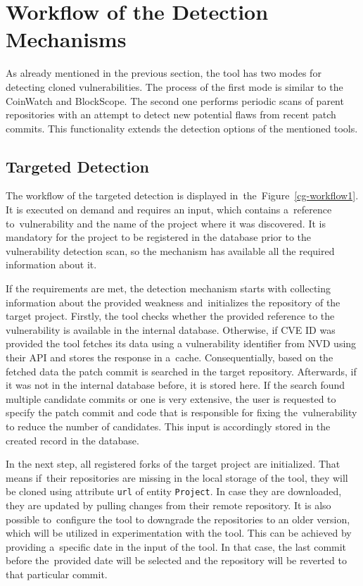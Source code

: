   \section{Workflow of the Detection Mechanisms}
  \label{section:workflow}
  As already mentioned in the previous section, the tool has two modes for detecting cloned vulnerabilities.
  The process of the first mode is similar to the CoinWatch and BlockScope. The second one
  performs periodic scans of parent repositories with an attempt to detect new potential
  flaws from recent patch commits. This functionality extends the detection options of the mentioned tools.

  \subsection*{Targeted Detection}
  \label{section:targeted-detection}
  The workflow of the targeted detection is displayed in~the~Figure~\ref{cg-workflow1}.
  It is executed on demand and requires an input, which contains a~reference to~vulnerability and the name of the project
  where it was discovered. It is mandatory for the project to be registered in the database prior to the vulnerability detection scan, so the mechanism
  has available all the required information about it.

  If the requirements are met, the detection mechanism starts with collecting information about the provided weakness
  and~initializes the repository of the target project. Firstly, the tool checks whether the provided reference
  to the vulnerability is available in the internal database. Otherwise, if CVE ID was provided the tool fetches
  its data using a vulnerability identifier from NVD using their API and stores the response in a~cache. Consequentially,
  based on the fetched
  data the patch commit is searched in the target repository. Afterwards, if it was not in the internal database
  before, it is stored here. If the search found multiple candidate commits or one is very extensive, the user
  is requested to specify the patch commit and code that is responsible for fixing the~vulnerability to reduce the number
  of candidates. This input is accordingly stored in the created record in the database.

  In the next step, all registered forks of the target project are initialized. That means if~their repositories
  are missing in the local storage of the tool, they will be cloned using attribute \texttt{url} of entity \texttt{Project}.
  In case they are downloaded, they are updated by pulling changes from their remote repository.
  It is also possible to~configure the tool to downgrade the repositories to an older version, which will be utilized
  in experimentation with the tool.
  This can be achieved by providing a~specific date in the input of the tool. In that case, the last commit
  before the~provided date will be selected and the repository will be reverted to that particular commit.

